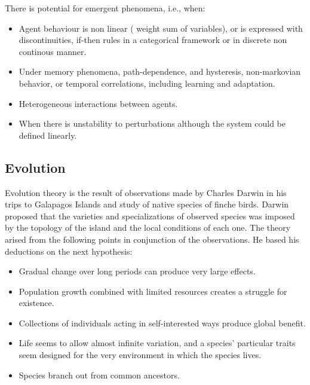 \documentclass[11pt,oneside,a4paper,openright]{report}
\begin{document}


There is potential for emergent phenomena, i.e., when: 
\begin{itemize}
 \item Agent behaviour is non linear ( weight sum of variables), or is expressed with discontinuities, if-then rules in a categorical framework or in discrete non continous manner.
 \item Under memory phenomena, path-dependence, and hysteresis, non-markovian behavior, or temporal correlations, including learning and adaptation. 
 \item Heterogeneous interactions between agents.
 \item When there is unstability to perturbations although the system could be defined linearly.
\end{itemize}


\subsection{Evolution}

Evolution theory is the result of observations made by Charles Darwin in his trips to Galapagos Islands and 
study of native species of finche birds. Darwin proposed that the varieties and specializations of observed
species was imposed by the topology of the island and the local conditions of each one. The theory arised from
the following points in conjunction of the observations. He based his deductions on
the next hypothesis:
\begin{itemize}
	\item Gradual change over long periods can produce very large effects.
	\item Population growth combined with limited resources creates a struggle for
	existence. 
	\item Collections of individuals acting in self-interested ways produce
	global benefit. 
	\item Life seems to allow almost infinite variation, and a species’
	particular traits seem designed for the very environment in which the species
	lives. 
	\item Species branch out from common ancestors.
\end{itemize}
\end{document}

